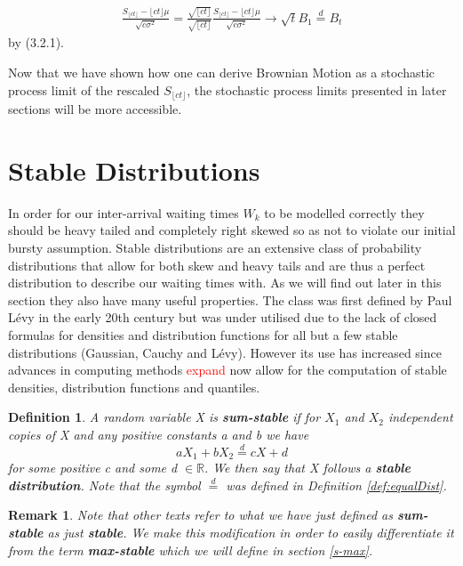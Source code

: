 \documentclass[honours,12pt]{UNSWthesis}
\newcommand{\R}{\mathbb{R}}
\newcommand{\1}{\mathbf 1}
\newtheorem{definition}[theorem]{Definition}
\newtheorem{remark}[theorem]{Remark}
\numberwithin{equation}{section}
\theoremstyle{definition}
\theoremstyle{remark}
\begin{document}

\begin{align*}
\frac{S_{\lfloor ct \rfloor} - \lfloor ct \rfloor\mu}{\sqrt{c \sigma^2}}
= \frac{\sqrt{\lfloor ct \rfloor}}{\sqrt{\lfloor ct \rfloor}}
\frac{S_{\lfloor ct \rfloor} - \lfloor ct \rfloor\mu}{\sqrt{c \sigma^2}}
\to \sqrt t B_1 \stackrel{d}{=} B_t
\end{align*}
by (3.2.1). 


Now that we have shown how one can derive Brownian Motion as a stochastic process limit of the rescaled $S_{\lfloor ct\rfloor}$, the stochastic process limits presented in later sections will be more accessible.


\section{Stable Distributions}
In order for our inter-arrival waiting times $W_k$ to be modelled correctly they should be heavy tailed and completely right skewed so as not to violate our initial bursty assumption.
Stable distributions are an extensive class of probability distributions that allow for both skew and heavy tails and are thus a perfect distribution to describe our waiting times with. As we will find out later in this section they also have many useful properties. The class was first defined by Paul L\'{e}vy in the early 20th century but was under utilised due to the lack of closed formulas for densities and distribution functions for all but a few stable distributions (Gaussian, Cauchy and L\'{e}vy). However its use has increased since advances in computing methods \textcolor{red}{expand} now allow for the computation of stable densities, distribution functions and quantiles.\\
\begin{definition}\cite{Nolan2015}
A random variable X is \textbf{sum-stable} if for $X_1$ and $X_2$ independent copies of X and any positive constants a and b we have
\[
	aX_1+bX_2\overset{d}{=}cX+d
\]
for some positive c and some d $\in\R.$ We then say that X follows a \textbf{stable distribution}. Note that the symbol $\overset{d}{=}$ was defined in Definition \ref{def:equalDist}.\\
\end{definition}
\begin{remark}
Note that other texts refer to what we have just defined as \textbf{sum-stable} as just \textbf{stable}. We make this modification in order to easily differentiate it from the term \textbf{max-stable} which we will define in section \ref{s-max}.\\
\end{remark}
\end{document}
